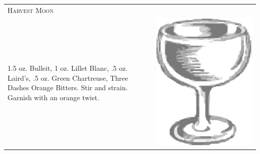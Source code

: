 \documentclass{article}
\begin{document}
\begin{tabular}{p{2in} p{0.5in}}
\multicolumn{2}{p{3in}}{\centering\Huge\textsc{Harvest Moon}} \\ 
  \vspace{-0.1in}1.5 oz. Bulleit, 1 oz. Lillet Blanc, .5 oz. Laird's, .5 oz. Green Chartreuse, Three Dashes Orange Bitters. Stir and strain. Garnish with an orange twist.  &
  \vspace{-0.1in} \includegraphics{coupe.png}
\end{tabular}
\end{document}

